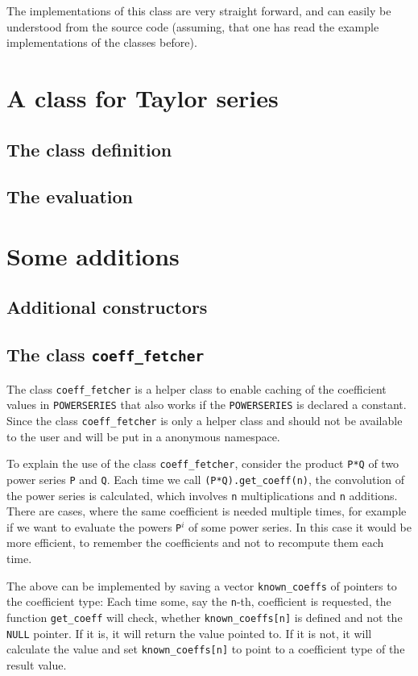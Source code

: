 \documentclass{article}
\newcommand{\code}[1]{\texttt{#1}}
\newcommand{\func}[1]{\texttt{#1}}
\newcommand{\NULL}{\texttt{NULL} pointer\xspace}
\begin{document}
The implementations of this class are very straight forward, and can easily be understood from the source code (assuming, that one has read the example implementations of the classes before).


\section{A class for Taylor series}

\subsection{The class definition}
\subsection{The evaluation}

\section{Some additions}

\subsection{Additional constructors}

\subsection{The class \code{coeff\_fetcher}}

The class \code{coeff\_fetcher} is a helper class to enable caching of the coefficient values in \func{POWERSERIES} that also works if the \func{POWERSERIES} is declared a constant. Since the class \code{coeff\_fetcher} is only a helper class and should not be available to the user and will be put in a anonymous namespace.

To explain the use of the class \code{coeff\_fetcher}, consider the product \code{P*Q} of two power series \code{P} and \code{Q}. Each time we call \code{(P*Q).get\_coeff(n)}, the convolution of the power series is calculated, which involves \code{n} multiplications and \code{n} additions. There are cases, where the same coefficient is needed multiple times, for example if we want to evaluate the powers \code{P}$^i$ of some power series. In this case it would be more efficient, to remember the coefficients and not to recompute them each time.

The above can be implemented by saving a vector \code{known\_coeffs} of pointers to the coefficient type: Each time some, say the \code{n}-th, coefficient is requested, the function \code{get\_coeff} will check, whether \code{known\_coeffs[n]} is defined and not the \NULL. If it is, it will return the value pointed to. If it is not, it will calculate the value and set \code{known\_coeffs[n]} to point to a coefficient type of the result value.
\end{document}
